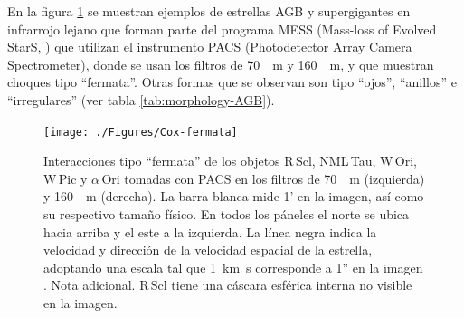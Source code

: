 En la figura  \ref{fig:fermata} se muestran ejemplos de estrellas AGB y supergigantes en infrarrojo lejano que forman parte del programa MESS (Mass-loss of Evolved StarS, \citet{Groenewegen:2011}) que utilizan el instrumento PACS (Photodetector Array Camera Spectrometer), donde se usan los filtros de \SI{70}{\mu.m} y \SI{160}{\mu.m}, y que muestran choques tipo ``fermata''. Otras formas que se observan son tipo ``ojos'', ``anillos'' e ``irregulares'' (ver tabla \ref{tab:morphology-AGB}).

\begin{figure}
  \centering
  \texttt{[image: ./Figures/Cox-fermata]}
  \caption{Interacciones tipo ``fermata'' de los objetos R\,Scl, NML\,Tau, W\,Ori, W\,Pic y $\alpha$\,Ori tomadas con PACS en los filtros de \SI{70}{\mu.m} (izquierda) y \SI{160}{\mu.m} (derecha). La barra blanca mide 1' en la imagen, así como su respectivo tamaño físico. En todos los páneles el norte se ubica hacia arriba y el este a la izquierda. La línea negra indica la velocidad y dirección de la velocidad espacial de la estrella, adoptando una escala tal que \SI{1}{km.s} corresponde a 1'' en la imagen \citep{Cox:2012}. Nota adicional. R\,Scl tiene una cáscara esférica interna no visible en la imagen.}
  \label{fig:fermata}
\end{figure}


